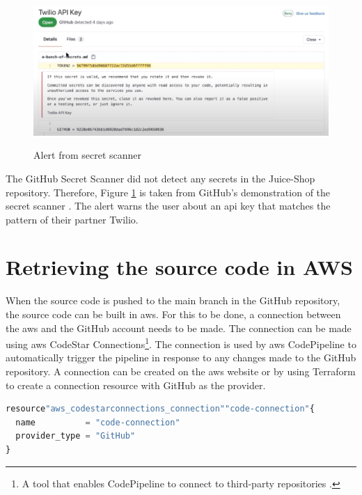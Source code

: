 \vspace{2mm}
\begin{figure}[H]
    \centering
    \includegraphics[width=0.8\columnwidth]{Images/secretscanneralert.png}
    \caption{Alert from secret scanner} \cite{GitHubVideo}
    \label{fig: Alert from secret scanner}
\end{figure}

The GitHub Secret Scanner did not detect any secrets in the Juice-Shop repository. Therefore, Figure \ref{fig: Alert from secret scanner} is taken from GitHub's demonstration of the secret scanner \cite{GitHubVideo}. The alert warns the user about an \acrshort{api} key that matches the pattern of their partner Twilio. 

\section{Retrieving the source code in AWS}
When the source code is pushed to the main branch in the GitHub repository, the source code can be built in \acrshort{aws}. For this to be done, a connection between the \acrshort{aws} and the GitHub account needs to be made. The connection can be made using \acrshort{aws} CodeStar Connections\footnote{A tool that enables CodePipeline to connect to third-party repositories \cite{CodeStarConnections}.}. The connection is used by \acrshort{aws} CodePipeline to automatically trigger the \gls{pipeline} in response to any changes made to the GitHub repository. A connection can be created on the \acrshort{aws} website or by using Terraform to create a connection resource with GitHub as the provider.

\vspace{2mm}
\begin{lstlisting}[language=terraform, caption=Create a connection between AWS and GitHub, captionpos=b, frame=single]
resource"aws_codestarconnections_connection""code-connection"{
  name          = "code-connection"
  provider_type = "GitHub" 
}
\end{lstlisting}

